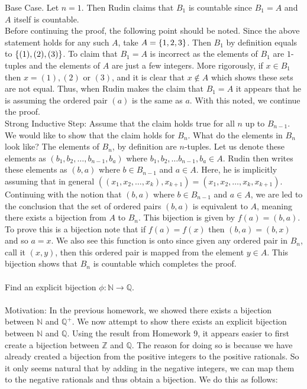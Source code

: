 \documentclass[12pt]{article}
\begin{document}
Base Case. Let $n=1$. Then Rudin claims that $B_{1}$ is countable since $B_{1}=A$ and $A$ itself is countable. \\ 

Before continuing the proof, the following point should be noted. Since the above statement holds for any such $A$, take $A=\left\{1,2,3\right\}$. Then $B_{1}$ by definition equals to $\left\{(1),(2),(3)\right\}$. To claim that $B_{1}=A$ is incorrect as the elements of $B_{1}$ are $1$-tuples and the elements of $A$ are just a few integers. More rigorously, if $x \in B_{1}$ then $x=(1), (2)$ or $(3)$, and it is clear that $x \notin A$ which shows these sets are not equal. Thus, when Rudin makes the claim that $B_{1}=A$ it appears that he is assuming the ordered pair $(a)$ is the same as $a$. With this noted, we continue the proof. \\ 

Strong Inductive Step: Assume that the claim holds true for all $n$ up to $B_{n-1}$. We would like to show that the claim holds for $B_{n}$. What do the elements in $B_{n}$ look like? The elements of $B_{n}$, by definition are $n$-tuples. Let us denote these elements as $(b_{1},b_{2},\ldots , b_{n-1}, b_{a})$ where $b_{1}, b_{2}, \ldots b_{n-1}, b_{a} \in A$. Rudin then writes these elements as $(b,a)$ where $b \in B_{n-1}$ and $a \in A$. Here, he is implicitly assuming that in general $((x_{1}, x_{2}, \ldots, x_{k}), x_{k+1})=(x_{1}, x_{2}, \ldots, x_{k}, x_{k+1})$.  \\ 

Continuing with the notion that $(b,a)$ where $b \in B_{n-1}$ and $a \in A$, we are led to the conclusion that the set of ordered pairs $(b,a)$ is equivalent to $A$, meaning there exists a bijection from $A$ to $B_{n}$. This bijection is given by $f(a)=(b,a)$. To prove this is a bijection note that if $f(a)=f(x)$ then $(b,a)=(b,x)$ and so $a=x$. We also see this function is onto since given any ordered pair in $B_{n}$, call it $(x,y)$, then this ordered pair is mapped from the element $y \in A$. This bijection shows that $B_{n}$ is countable which completes the proof. \\ \\

\problem
Find an explicit bijection $\phi: \mathbb{N} \rightarrow \mathbb{Q}$. \\ \\

Motivation: In the previous homework, we showed there exists a bijection between $\mathbb{N}$ and $\mathbb{Q}^{+}$. We now attempt to show there exists an explicit bijection between $\mathbb{N}$ and $\mathbb{Q}$. Using the result from Homework 9, it appears easier to first create a bijection between $\mathbb{Z}$ and $\mathbb{Q}$. The reason for doing so is because we have already created a bijection from the positive integers to the positive rationals. So it only seems natural that by adding in the negative integers, we can map them to the negative rationals and thus obtain a bijection. We do this as follows:
\end{document}

